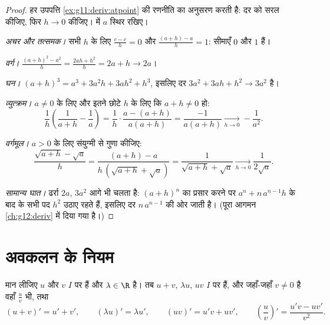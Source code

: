 \begin{proof}
हर उपपत्ति \cref{ex:g11:deriv:atpoint} की रणनीति का अनुसरण करती है: दर को सरल कीजिए, फिर $h \to 0$
कीजिए।  में $a$ स्थिर रखिए।

\emph{अचर और तत्समक।} सभी $h$ के लिए $\frac{c - c}{h} = 0$ और $\frac{(a+h) - a}{h} = 1$: सीमाएँ $0$ और $1$
हैं।

\emph{वर्ग।} $\frac{(a+h)^2 - a^2}{h} = \frac{2ah + h^2}{h} = 2a + h
\to 2a$।

\emph{घन।} $(a+h)^3 = a^3 + 3a^2h + 3ah^2 + h^3$, इसलिए दर $3a^2 + 3ah + h^2 \to 3a^2$ है।

\emph{व्युत्क्रम।} $a \neq 0$ के लिए और इतने छोटे $h$ के लिए कि $a + h \neq 0$ हो:
\[
\frac{1}{h}\left(\frac{1}{a+h} - \frac{1}{a}\right)
= \frac{1}{h} \cdot \frac{a - (a+h)}{a(a+h)}
= \frac{-1}{a(a+h)}
\xrightarrow[h \to 0]{} -\frac{1}{a^2}.
\]

\emph{वर्गमूल।} $a > 0$ के लिए संयुग्मी से गुणा कीजिए:
\[
\frac{\sqrt{a+h} - \sqrt a}{h}
= \frac{(a + h) - a}{h\,(\sqrt{a+h} + \sqrt a)}
= \frac{1}{\sqrt{a+h} + \sqrt a}
\xrightarrow[h \to 0]{} \frac{1}{2\sqrt a}.
\]

\emph{सामान्य घात।} ढर्रा $2a$, $3a^2$ आगे भी चलता है: $(a+h)^n$ का प्रसार करने
पर $a^n + n\,a^{n-1}h$ के बाद के सभी पद $h^2$ उठाए रहते हैं, इसलिए दर $n\,a^{n-1}$ की ओर जाती है।
(पूरा आगमन \cref{ch:g12:deriv} में दिया गया है।)
\end{proof}

\section{अवकलन के नियम}

\begin{theorem}[संक्रियाएँ]\label{thm:g11:deriv:rules}
मान लीजिए $u$ और $v$ $I$ पर  हैं और $\lambda \in \R$ है। तब $u + v$, $\lambda u$,
$uv$ $I$ पर  हैं, और जहाँ-जहाँ $v \neq 0$ है वहाँ $\frac{u}{v}$ भी, तथा
\[
(u+v)' = u' + v', \qquad
(\lambda u)' = \lambda u', \qquad
(uv)' = u'v + uv', \qquad
\left(\frac{u}{v}\right)' = \frac{u'v - uv'}{v^2}.
\]
\end{theorem}

